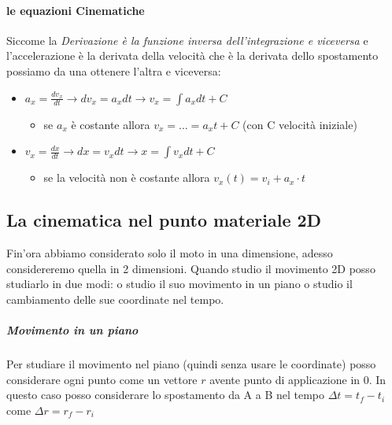 \documentclass[12pt, a4paper, openany]{book}
\begin{document}
\paragraph*{le equazioni Cinematiche}
Siccome la \emph{Derivazione è la funzione inversa dell'integrazione e viceversa} e l'accelerazione è la derivata della velocità che è la derivata dello spostamento
possiamo da una ottenere l'altra e viceversa:
\begin{itemize} %
    \item $a_x = \frac{dv_x}{dt} \to dv_x = a_xdt \to v_x = \int a_x dt + C$
          \begin{itemize}
              \item se $a_x$ è costante allora $v_x = ... = a_x t + C$ (con C velocità iniziale)
          \end{itemize}
    \item $v_x = \frac{dx}{dt} \to dx = v_xdt \to x = \int v_xdt + C$
          \begin{itemize}
              \item se la velocità non è costante allora $v_x(t) = v_i + a_x \cdot t$
          \end{itemize}
\end{itemize}
\subsection{La cinematica nel punto materiale 2D}
Fin'ora abbiamo considerato solo il moto in una dimensione, adesso considereremo quella in 2 dimensioni.
Quando studio il movimento 2D posso studiarlo in due modi: o studio il suo movimento in un piano o studio il cambiamento delle sue coordinate nel tempo.
\subparagraph*{Movimento in un piano} Per studiare il movimento nel piano (quindi senza usare le coordinate) posso considerare ogni
punto come un vettore $r$ avente punto di applicazione in 0.
In questo caso posso considerare lo spostamento da A a B nel tempo $\Delta t = t_f-t_i$ come $\Delta r = r_f-r_i$
\end{document}
